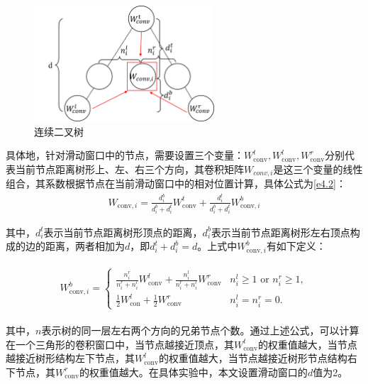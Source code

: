 \begin{figure}[H]
  \centering
  \includegraphics[width=0.6\textwidth]{figures/Continuous Binary Tree.png}
  \caption{连续二叉树}\label{fig:Continuous}
\end{figure}

具体地，针对滑动窗口中的节点，需要设置三个变量：$W_{\text{conv}}^{t},W_{\text{conv}}^{l},W_{\text{conv}}^{r}$分别代表当前节点距离树形上、左、右三个方向，其卷积矩阵$W_{conv,i}$是这三个变量的线性组合，其系数根据节点在当前滑动窗口中的相对位置计算，具体公式为\ref{e4.2}：
\begin{equation}\label{e4.2}
  \begin{split}
    W_{\text{conv}, i}=\frac{d_{i}^{b}}{d_{i}^{b}+d_{i}^{t}} W_{\text{conv}}^{t}+\frac{d_{i}^{t}}{d_{i}^{b}+d_{i}^{t}} W_{\text{conv}, i}^{b}
  \end{split}
\end{equation}

其中，$d_{i}^{t}$表示当前节点距离树形顶点的距离，$d_{i}^{b}$表示当前节点距离树形左右顶点构成的边的距离，两者相加为$d$，即$d_{i}^{t} + d_{i}^{b} = d$。上式中$W_{\text{conv}, i}^{b}$有如下定义：

\begin{equation}\label{e4.3}
  \begin{split}
    \begin{array}{l}
      W_{\text{conv}, i}^{b}= 
      \left\{\begin{array}{ll}
      \frac{n_{i}^{r}}{n_{i}^{r}+n_{i}^{l}} W_{\text {conv}}^{l}+\frac{n_{i}^{l}}{n_{i}^{r}+n_{i}^{l}} W_{\text{conv}}^{r} & n_{i}^{l} \geq 1 \text { or } n_{i}^{r} \geq 1, \\
      \frac{1}{2} W_{\text{con}}^{l}+\frac{1}{2} W_{\text{conv}}^{r} & n_{i}^{l}=n_{i}^{r}=0 .
      \end{array}\right.
      \end{array}
  \end{split}
\end{equation}

其中，$n$表示树的同一层左右两个方向的兄弟节点个数。通过上述公式，可以计算在一个三角形的卷积窗口中，当节点越接近顶点，其$W_{\text{conv}}^{t}$的权重值越大，当节点越接近树形结构左下节点，其$W_{\text{conv}}^{l}$的权重值越大，当节点越接近树形节点结构右下节点，其$W_{\text{conv}}^{r}$的权重值越大。在具体实验中，本文设置滑动窗口的$d$值为2。

